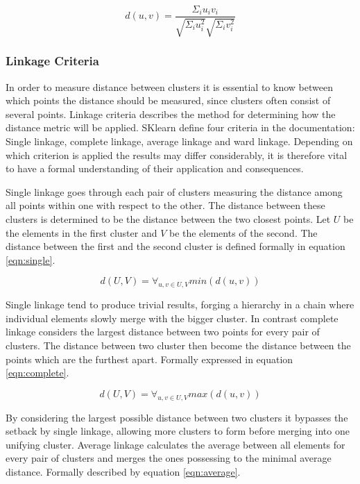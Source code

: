 \begin{equation}
\label{eqn:cosine}
d(u, v) = \frac{\Sigma_i u_iv_i}{\sqrt{\Sigma_i u_i^2}\sqrt{\Sigma_i v_i^2}}
\end{equation}

\subsubsection{Linkage Criteria}
In order to measure distance between clusters it is essential to know between which points the distance should be measured, since clusters often consist of several points. Linkage criteria describes the method for determining how the distance metric will be applied. SKlearn define four criteria in the documentation\cite{scikit}: Single linkage, complete linkage, average linkage and ward linkage. Depending on which criterion is applied the results may differ considerably, it is therefore vital to have a formal understanding of their application and consequences.

Single linkage goes through each pair of clusters measuring the distance among all points within one with respect to the other. The distance between these clusters is determined to be the distance between the two closest points. Let $U$ be the elements in the first cluster and $V$ be the elements of the second. The distance between the first and the second cluster is defined formally in equation \ref{eqn:single}.

\begin{equation}
\label{eqn:single}
d(U, V) = \forall_{u, v \in U, V} min(d(u, v))
\end{equation}

Single linkage tend to produce trivial results, forging a hierarchy in a chain where individual elements slowly merge with the bigger cluster. In contrast complete linkage considers the largest distance between two points for every pair of clusters. The distance between two cluster then become the distance between the points which are the furthest apart. Formally expressed in equation \ref{eqn:complete}.

\begin{equation}
\label{eqn:complete}
d(U, V) = \forall_{u, v \in U, V} max(d(u, v))
\end{equation}

By considering the largest possible distance between two clusters it bypasses the setback by single linkage, allowing more clusters to form before merging into one unifying cluster. Average linkage calculates the average between all elements for every pair of clusters and merges the ones possessing to the minimal average distance. Formally described by equation \ref{eqn:average}.

